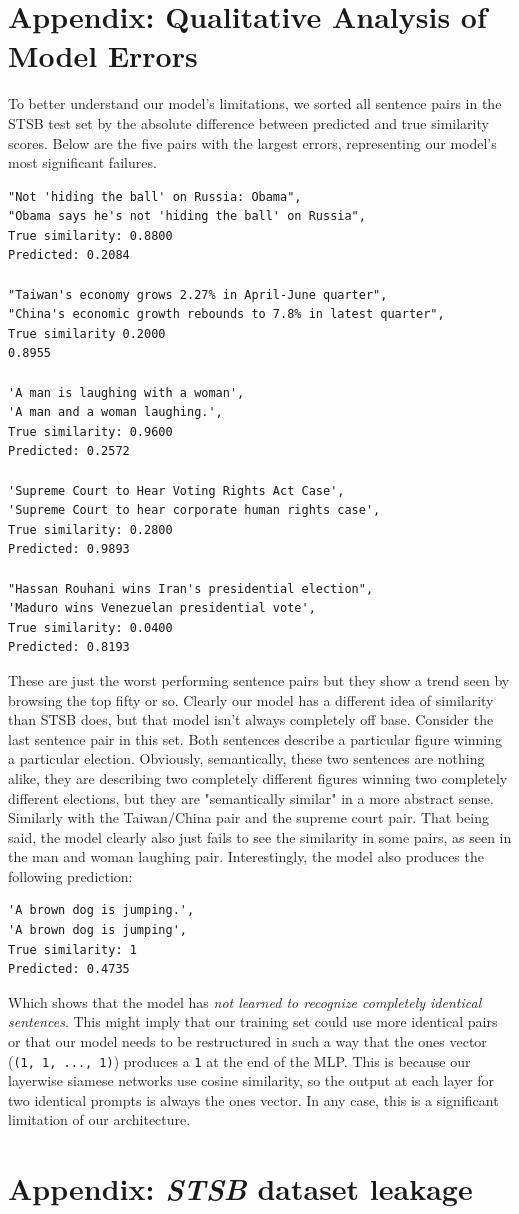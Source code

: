 \documentclass[14pt]{article}
\begin{document}
\newpage
\section{Appendix: Qualitative Analysis of Model Errors} \label{error analysis}
To better understand our model's limitations, we sorted all sentence pairs in the STSB test set by the absolute difference between predicted and true similarity scores. Below are the five pairs with the largest errors, representing our model's most significant failures.

\begin{verbatim}
"Not 'hiding the ball' on Russia: Obama",
"Obama says he's not 'hiding the ball' on Russia",
True similarity: 0.8800
Predicted: 0.2084

"Taiwan's economy grows 2.27% in April-June quarter",
"China's economic growth rebounds to 7.8% in latest quarter",
True similarity 0.2000
0.8955

'A man is laughing with a woman',
'A man and a woman laughing.',
True similarity: 0.9600
Predicted: 0.2572

'Supreme Court to Hear Voting Rights Act Case',
'Supreme Court to hear corporate human rights case',
True similarity: 0.2800
Predicted: 0.9893

"Hassan Rouhani wins Iran's presidential election",
'Maduro wins Venezuelan presidential vote',
True similarity: 0.0400
Predicted: 0.8193
\end{verbatim}
These are just the worst performing sentence pairs but they show a trend seen by browsing the top fifty or so. Clearly our model has a different idea of similarity than STSB does, but that model isn't always completely off base. Consider the last sentence pair in this set. Both sentences describe a particular figure winning a particular election. Obviously, semantically, these two sentences are nothing alike, they are describing two completely different figures winning two completely different elections, but they are "semantically similar" in a more abstract sense. Similarly with the Taiwan/China pair and the supreme court pair. That being said, the model clearly also just fails to see the similarity in some pairs, as seen in the man and woman laughing pair. Interestingly, the model also produces the following prediction:
\begin{verbatim}
'A brown dog is jumping.',
'A brown dog is jumping',
True similarity: 1
Predicted: 0.4735
\end{verbatim}
Which shows that the model has \textit{not learned to recognize completely identical sentences}. This might imply that our training set could use more identical pairs or that our model needs to be restructured in such a way that the ones vector (\verb|(1, 1, ..., 1)|) produces a \verb|1| at the end of the MLP. This is because our layerwise siamese networks use cosine similarity, so the output at each layer for two identical prompts is always the ones vector. In any case, this is a significant limitation of our architecture.

\newpage
\section{Appendix: \textit{STSB} dataset leakage} 
\newpage
{}

\end{document}
